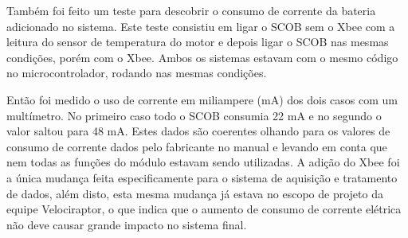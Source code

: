 Também foi feito um teste para descobrir o consumo de corrente da bateria adicionado no sistema. Este teste consistiu em ligar o SCOB sem o Xbee com a leitura do sensor de temperatura do motor e depois ligar o SCOB nas mesmas condições, porém com o Xbee. Ambos os sistemas estavam com o mesmo código no microcontrolador, rodando nas mesmas condições.

Então foi medido o uso de corrente em miliampere (mA) dos dois casos com um multímetro. No primeiro caso todo o SCOB consumia 22 mA e no segundo o valor saltou para 48 mA. Estes dados são coerentes olhando para os valores de consumo de corrente dados pelo fabricante no manual \cite{xbeeuserguide} e levando em conta que nem todas as funções do módulo estavam sendo utilizadas. A adição do Xbee foi a única mudança feita especificamente para o sistema de aquisição e tratamento de dados, além disto, esta mesma mudança já estava no escopo de projeto da equipe Velociraptor, o que indica que o aumento de consumo de corrente elétrica não deve causar grande impacto no sistema final.
